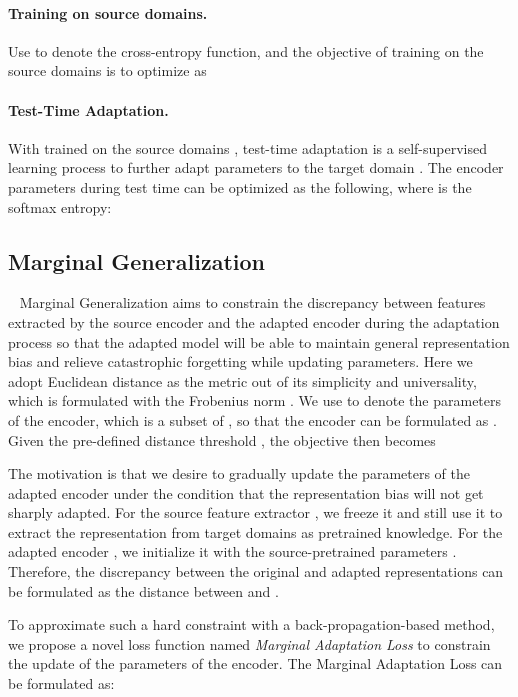 \documentclass{article} \usepackage{iclr2024_conference,times}
\begin{document}
    \paragraph{Training on source domains.}
    Use  to denote the cross-entropy function, and the objective of training on the source domains is to optimize  as
    

    \paragraph{Test-Time Adaptation.}
   With  trained on the source domains , test-time adaptation is a self-supervised learning process to further adapt parameters to the target domain . The encoder parameters during test time can be optimized as the following, where  is the softmax entropy:
    
    

    
    \subsection{Marginal Generalization}~\label{sec:method:feat}
    Marginal Generalization aims to constrain the discrepancy between features extracted by the source encoder  and the adapted encoder  during the adaptation process so that the adapted model will be able to maintain general representation bias and relieve catastrophic forgetting while updating parameters. Here we adopt Euclidean distance as the metric out of its simplicity and universality, which is formulated with the Frobenius norm . We use  to denote the parameters of the encoder, which is a subset of , so that the encoder can be formulated as . Given the pre-defined distance threshold , the objective then becomes
    
    The motivation is that we desire to gradually update the parameters of the adapted encoder under the condition that the representation bias will not get sharply adapted. For the source feature extractor , we freeze it and still use it to extract the representation from target domains as pretrained knowledge. For the adapted encoder , we initialize it with the source-pretrained parameters . Therefore, the discrepancy between the original and adapted representations can be formulated as the distance between  and .
    
    To approximate such a hard constraint with a back-propagation-based method, we propose a novel loss function named \emph{Marginal Adaptation Loss} to constrain the update of the parameters of the encoder. The Marginal Adaptation Loss can be formulated as:
    
\end{document}
